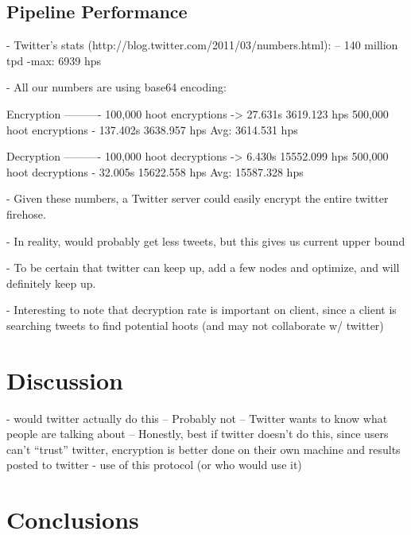 \documentclass{acm_proc_article-sp}
\begin{document}
\subsection{Pipeline Performance}

- Twitter's stats (http://blog.twitter.com/2011/03/numbers.html):
	-- 140 million tpd
	-max: 6939 hps
	
- All our numbers are using base64 encoding:

Encryption
----------
100,000 hoot encryptions -> 27.631s        3619.123 hps
500,000 hoot encryptions - 137.402s        3638.957 hps
Avg: 3614.531 hps

Decryption
----------
100,000 hoot decryptions -> 6.430s         15552.099 hps
500,000 hoot decryptions - 32.005s         15622.558 hps
Avg: 15587.328 hps

- Given these numbers, a Twitter server could easily encrypt the entire twitter firehose.

- In reality, would probably get less tweets, but this gives us current upper bound

- To be certain that twitter can keep up, add a few nodes and optimize, and will definitely keep up.

- Interesting to note that decryption rate is important on client, since a client is searching tweets to find potential hoots (and may not collaborate w/ twitter)



\section{Discussion}

- would twitter actually do this
	-- Probably not
	-- Twitter wants to know what people are talking about
	-- Honestly, best if twitter doesn't do this, since users can't ``trust'' twitter, encryption is better done on their own machine and results posted to twitter
- use of this protocol (or who would use it)

\section{Conclusions}






\balancecolumns{}
\end{document}
